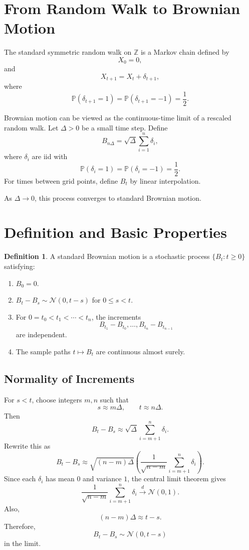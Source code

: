 \documentclass[12pt,oneside]{book}
\numberwithin{equation}{section}
\theoremstyle{definition}
\newtheorem{definition}{Definition}[section]
\theoremstyle{plain}
\theoremstyle{remark}
\newcommand{\Z}{\mathbb{Z}}
\newcommand{\Prob}{\mathbb{P}}
\newcommand{\convd}{\overset{d}{\to}}
\newcommand{\Normal}{\mathcal{N}}
\begin{document}
\section{From Random Walk to Brownian Motion}

The standard symmetric random walk on $\Z$ is a Markov chain defined by
\[
X_0=0,
\]
and
\[
X_{t+1}=X_t+\delta_{t+1},
\]
where
\[
\Prob(\delta_{t+1}=1)=\Prob(\delta_{t+1}=-1)=\frac{1}{2}.
\]

Brownian motion can be viewed as the continuous-time limit of a rescaled random walk. Let $\Delta>0$ be a small time step. Define
\[
B_{n\Delta}
=
\sqrt{\Delta}\sum_{i=1}^n \delta_i,
\]
where $\delta_i$ are iid with
\[
\Prob(\delta_i=1)=\Prob(\delta_i=-1)=\frac{1}{2}.
\]
For times between grid points, define $B_t$ by linear interpolation.

As $\Delta\to 0$, this process converges to standard Brownian motion.

\section{Definition and Basic Properties}

\begin{definition}
A standard Brownian motion is a stochastic process $\{B_t:t\ge 0\}$ satisfying:
\begin{enumerate}
\item $B_0=0$.
\item $B_t-B_s\sim \Normal(0,t-s)$ for $0\le s<t$.
\item For $0=t_0<t_1<\cdots<t_n$, the increments
\[
B_{t_1}-B_{t_0},\ldots,B_{t_n}-B_{t_{n-1}}
\]
are independent.
\item The sample paths $t\mapsto B_t$ are continuous almost surely.
\end{enumerate}
\end{definition}

\subsection{Normality of Increments}

For $s<t$, choose integers $m,n$ such that
\[
s\approx m\Delta,
\qquad
t\approx n\Delta.
\]
Then
\[
B_t-B_s
\approx
\sqrt{\Delta}\sum_{i=m+1}^n \delta_i.
\]
Rewrite this as
\[
B_t-B_s
\approx
\sqrt{(n-m)\Delta}
\left(
\frac{1}{\sqrt{n-m}}\sum_{i=m+1}^n \delta_i
\right).
\]
Since each $\delta_i$ has mean $0$ and variance $1$, the central limit theorem gives
\[
\frac{1}{\sqrt{n-m}}\sum_{i=m+1}^n \delta_i
\convd
\Normal(0,1).
\]
Also,
\[
(n-m)\Delta \approx t-s.
\]
Therefore,
\[
B_t-B_s\sim \Normal(0,t-s)
\]
in the limit.
\end{document}
